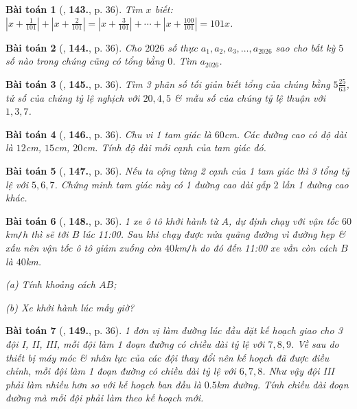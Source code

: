 \documentclass{article}
\numberwithin{equation}{section}
\newtheorem{baitoan}{Bài toán}
\begin{document}
\begin{baitoan}[\cite{Tuyen_Toan_7}, \textbf{143.}, p. 36]
	Tìm $x$ biết: $\left|x + \frac{1}{101}\right| + \left|x + \frac{2}{101}\right| = \left|x + \frac{3}{101}\right| + \cdots + \left|x + \frac{100}{101}\right| = 101x$.
\end{baitoan}

\begin{baitoan}[\cite{Tuyen_Toan_7}, \textbf{144.}, p. 36]
	Cho $2026$ số thực $a_1,a_2,a_3,\ldots,a_{2026}$ sao cho bất kỳ $5$ số nào trong chúng cũng có tổng bằng $0$. Tìm $a_{2026}$.
\end{baitoan}

\begin{baitoan}[\cite{Tuyen_Toan_7}, \textbf{145.}, p. 36]
	Tìm 3 phân số tối giản biết tổng của chúng bằng $5\frac{25}{63}$, tử số của chúng tỷ lệ nghịch với $20,4,5$ \& mẫu số của chúng tỷ lệ thuận với $1,3,7$.
\end{baitoan}

\begin{baitoan}[\cite{Tuyen_Toan_7}, \textbf{146.}, p. 36]
	Chu vi 1 tam giác là $60$\emph{cm}. Các đường cao có độ dài là $12$\emph{cm}, $15$\emph{cm}, $20$\emph{cm}. Tính độ dài mỗi cạnh của tam giác đó.
\end{baitoan}

\begin{baitoan}[\cite{Tuyen_Toan_7}, \textbf{147.}, p. 36]
	Nếu ta cộng từng 2 cạnh của 1 tam giác thì 3 tổng tỷ lệ với $5,6,7$. Chứng minh tam giác này có 1 đường cao dài gấp $2$ lần 1 đường cao khác.
\end{baitoan}

\begin{baitoan}[\cite{Tuyen_Toan_7}, \textbf{148.}, p. 36]
	1 xe ô tô khởi hành từ $A$, dự định chạy với vận tốc $60$\emph{km\texttt{/}h} thì sẽ tới $B$ lúc 11:00. Sau khi chạy được nửa quãng đường vì đường hẹp \& xấu nên vận tốc ô tô giảm xuống còn $40$\emph{km\texttt{/}h} do đó đến 11:00 xe vẫn còn cách $B$ là $40$\emph{km}.
	\begin{enumerate*}
		\item[(a)] Tính khoảng cách $AB$;
		\item[(b)] Xe khởi hành lúc mấy giờ?
	\end{enumerate*}
\end{baitoan}

\begin{baitoan}[\cite{Tuyen_Toan_7}, \textbf{149.}, p. 36]
	1 đơn vị làm đường lúc đầu đặt kế hoạch giao cho 3 đội I, II, III, mỗi đội làm 1 đoạn đường có chiều dài tỷ lệ với $7,8,9$. Về sau do thiết bị máy móc \& nhân lực của các đội thay đổi nên kế hoạch đã được điều chỉnh, mỗi đội làm 1 đoạn đường có chiều dài tỷ lệ với $6,7,8$. Như vậy đội III phải làm nhiều hơn so với kế hoạch ban đầu là $0.5$\emph{km} đường. Tính chiều dài đoạn đường mà mỗi đội phải làm theo kế hoạch mới.
\end{baitoan}


\printbibliography[heading=bibintoc]
	
\end{document}

